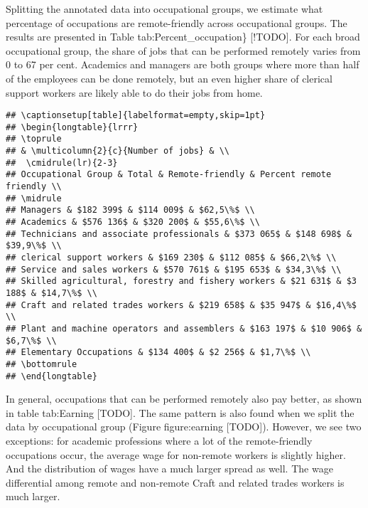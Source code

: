 \documentclass[11pt,]{article}
\begin{document}
Splitting the annotated data into occupational groups, we estimate what
percentage of occupations are remote-friendly across occupational
groups. The results are presented in Table tab:Percent\_occupation\}
{[}!TODO{]}. For each broad occupational group, the share of jobs that
can be performed remotely varies from 0 to 67 per cent. Academics and
managers are both groups where more than half of the employees can be
done remotely, but an even higher share of clerical support workers are
likely able to do their jobs from home.

\begin{verbatim}
## \captionsetup[table]{labelformat=empty,skip=1pt}
## \begin{longtable}{lrrr}
## \toprule
## & \multicolumn{2}{c}{Number of jobs} & \\ 
##  \cmidrule(lr){2-3}
## Occupational Group & Total & Remote-friendly & Percent remote friendly \\ 
## \midrule
## Managers & $182 399$ & $114 009$ & $62,5\%$ \\ 
## Academics & $576 136$ & $320 200$ & $55,6\%$ \\ 
## Technicians and associate professionals & $373 065$ & $148 698$ & $39,9\%$ \\ 
## clerical support workers & $169 230$ & $112 085$ & $66,2\%$ \\ 
## Service and sales workers & $570 761$ & $195 653$ & $34,3\%$ \\ 
## Skilled agricultural, forestry and fishery workers & $21 631$ & $3 188$ & $14,7\%$ \\ 
## Craft and related trades workers & $219 658$ & $35 947$ & $16,4\%$ \\ 
## Plant and machine operators and assemblers & $163 197$ & $10 906$ & $6,7\%$ \\ 
## Elementary Occupations & $134 400$ & $2 256$ & $1,7\%$ \\ 
## \bottomrule
## \end{longtable}
\end{verbatim}

In general, occupations that can be performed remotely also pay better,
as shown in table tab:Earning {[}TODO{]}. The same pattern is also found
when we split the data by occupational group (Figure figure:earning
{[}TODO{]}). However, we see two exceptions: for academic professions
where a lot of the remote-friendly occupations occur, the average wage
for non-remote workers is slightly higher. And the distribution of wages
have a much larger spread as well. The wage differential among remote
and non-remote Craft and related trades workers is much larger.
\end{document}
